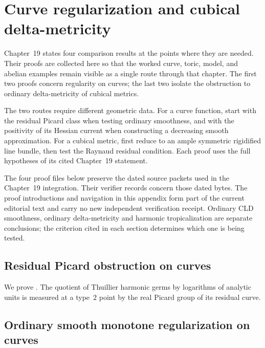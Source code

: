 \chapter{Curve regularization and cubical delta-metricity}
\label{app:ch19-comparison-proofs}

Chapter~19 states four comparison results at the points where they are
needed.  Their proofs are collected here so that the worked curve, toric,
model, and abelian examples remain visible as a single route through that
chapter.  The first two proofs concern regularity on curves; the last two
isolate the obstruction to ordinary delta-metricity of cubical metrics.

The two routes require different geometric data. For a curve function,
start with the residual Picard class when testing ordinary smoothness, and
with the positivity of its Hessian current when constructing a decreasing
smooth approximation. For a cubical metric, first reduce to an ample
symmetric rigidified line bundle, then test the Raynaud residual condition.
Each proof uses the full hypotheses of its cited Chapter~19 statement.

\begin{remark}
\label{rem:appN-proof-boundary}
The four proof files below preserve the dated source packets used in the
Chapter~19 integration. Their verifier records concern those dated bytes.
The proof introductions and navigation in this appendix form part of the
current editorial text and carry no new independent verification receipt.
Ordinary CLD smoothness, ordinary delta-metricity and harmonic
tropicalization are separate conclusions; the criterion cited in each
section determines which one is being tested.
\end{remark}

\section{Residual Picard obstruction on curves}
\label{sec:appN-residual-picard}

We prove .  The quotient of
Thuillier harmonic germs by logarithms of analytic units is measured at a
type~\(2\) point by the real Picard group of its residual curve.



\section{Ordinary smooth monotone regularization on curves}
\label{sec:appN-curve-regularization}


